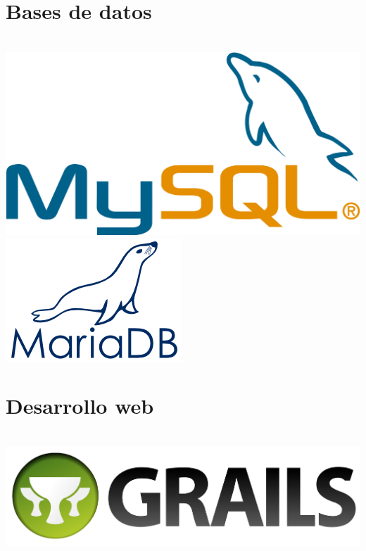 \documentclass[]{friggeri-cv}
\begin{document}
\begin{aside}
    \section{Bases de datos}
    ~
    \includegraphics[scale=0.04]{img/mysql.png}
    \includegraphics[scale=0.30]{img/mariadb.png}
    ~
    \section{Desarrollo web}
    ~
    \includegraphics[scale=0.02]{img/grails.png}
    ~
\end{aside}
\end{document}

